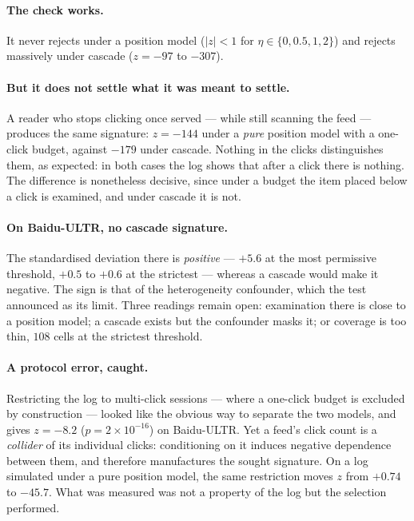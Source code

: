 \documentclass[11pt,a4paper]{article}
\begin{document}
\paragraph{The check works.} It never rejects under a position model ($|z| < 1$ for
$\eta \in \{0, 0.5, 1, 2\}$) and rejects massively under cascade ($z = -97$ to $-307$).

\paragraph{But it does not settle what it was meant to settle.} A reader who stops clicking once
served --- while still scanning the feed --- produces the same signature: $z = -144$ under a
\emph{pure} position model with a one-click budget, against $-179$ under cascade. Nothing in the
clicks distinguishes them, as expected: in both cases the log shows that after a click there is
nothing. The difference is nonetheless decisive, since under a budget the item placed below a
click is examined, and under cascade it is not.

\paragraph{On Baidu-ULTR, no cascade signature.} The standardised deviation there is
\emph{positive} --- $+5.6$ at the most permissive threshold, $+0.5$ to $+0.6$ at the strictest ---
whereas a cascade would make it negative. The sign is that of the heterogeneity confounder, which
the test announced as its limit. Three readings remain open: examination there is close to a
position model; a cascade exists but the confounder masks it; or coverage is too thin, $108$ cells
at the strictest threshold.

\paragraph{A protocol error, caught.} Restricting the log to multi-click sessions --- where a
one-click budget is excluded by construction --- looked like the obvious way to separate the two
models, and gives $z = -8.2$ ($p = 2 \times 10^{-16}$) on Baidu-ULTR. Yet a feed's click count is
a \emph{collider} of its individual clicks: conditioning on it induces negative dependence between
them, and therefore manufactures the sought signature. On a log simulated under a pure position
model, the same restriction moves $z$ from $+0.74$ to $-45.7$. What was measured was not a
property of the log but the selection performed.
\end{document}
